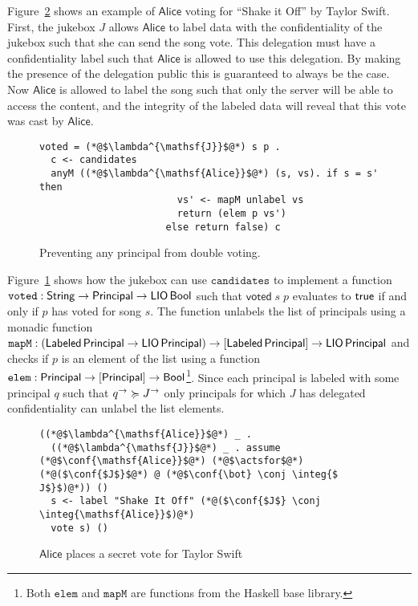Figure~\ref{fig:jukebox-alice-votes-for-taylor-swift} shows an example of $\mathsf{Alice}$ voting for ``Shake it Off'' by Taylor Swift. First, the jukebox $J$ allows $\mathsf{Alice}$ to label data with the confidentiality of the jukebox such that she can send the song vote. This delegation must have a confidentiality label such that $\mathsf{Alice}$ is allowed to use this delegation. By making the presence of the delegation public this is guaranteed to always be the case. Now $\mathsf{Alice}$ is allowed to label the song such that only the server will be able to access the content, and the integrity of the labeled data will reveal that this vote was cast by $\mathsf{Alice}$.

\begin{figure}
\centering
\begin{lstlisting}
voted = (*@$\lambda^{\mathsf{J}}$@*) s p .
  c <- candidates
  anyM ((*@$\lambda^{\mathsf{Alice}}$@*) (s, vs). if s = s' then
                        vs' <- mapM unlabel vs
                        return (elem p vs')
                      else return false) c
\end{lstlisting}
\caption{Preventing any principal from double voting.}
\label{fig:prevent-double-voting}
\end{figure}

Figure~\ref{fig:prevent-double-voting} shows how the jukebox can use $\mathtt{candidates}$ to implement a function $\mathtt{voted}: \mathsf{String} \to \mathsf{Principal} \to \mathsf{LIO}\,\mathsf{Bool}$ such that $\mathsf{voted}\; s\; p$ evaluates to $\mathsf{true}$ if and only if $p$ has voted for song $s$. The function unlabels the list of principals using a monadic function $\mathtt{mapM}: (\mathsf{Labeled}\,\mathsf{Principal} \to \mathsf{LIO}\,\mathsf{Principal}) \to \lbrack\mathsf{Labeled}\,\mathsf{Principal}\rbrack \to \mathsf{LIO}\,\mathsf{Principal}$ and checks if $p$ is an element of the list using a function $\mathtt{elem}: \mathsf{Principal} \to \lbrack\mathsf{Principal}\rbrack \to \mathsf{Bool}$\footnote{Both $\mathtt{elem}$ and $\mathtt{mapM}$ are functions from the Haskell base library.}. Since each principal is labeled with some principal $q$ such that $q^{\rightarrow} \succcurlyeq J^{\rightarrow}$ only principals for which $J$ has delegated confidentiality can unlabel the list elements.

\begin{figure}
\centering
\begin{lstlisting}
((*@$\lambda^{\mathsf{Alice}}$@*) _ .
  ((*@$\lambda^{\mathsf{J}}$@*) _ . assume (*@$\conf{\mathsf{Alice}}$@*) (*@$\actsfor$@*) (*@($\conf{$J$}$@*) @ (*@$\conf{\bot} \conj \integ{$ J$}$)@*)) ()
  s <- label "Shake It Off" (*@($\conf{$J$} \conj \integ{\mathsf{Alice}}$)@*)
  vote s) ()
\end{lstlisting}
\caption{$\mathsf{Alice}$ places a secret vote for Taylor Swift}
\label{fig:jukebox-alice-votes-for-taylor-swift}
\end{figure}


